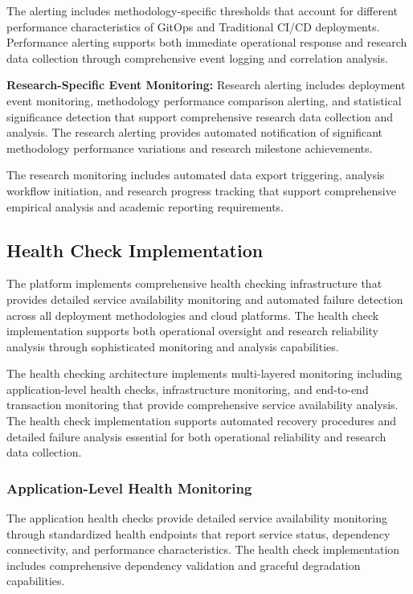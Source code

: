 The alerting includes methodology-specific thresholds that account for different performance characteristics of GitOps and Traditional CI/CD deployments. Performance alerting supports both immediate operational response and research data collection through comprehensive event logging and correlation analysis.

\textbf{Research-Specific Event Monitoring:}
Research alerting includes deployment event monitoring, methodology performance comparison alerting, and statistical significance detection that support comprehensive research data collection and analysis. The research alerting provides automated notification of significant methodology performance variations and research milestone achievements.

The research monitoring includes automated data export triggering, analysis workflow initiation, and research progress tracking that support comprehensive empirical analysis and academic reporting requirements.

\subsection{Health Check Implementation}

The platform implements comprehensive health checking infrastructure that provides detailed service availability monitoring and automated failure detection across all deployment methodologies and cloud platforms. The health check implementation supports both operational oversight and research reliability analysis through sophisticated monitoring and analysis capabilities.

The health checking architecture implements multi-layered monitoring including application-level health checks, infrastructure monitoring, and end-to-end transaction monitoring that provide comprehensive service availability analysis. The health check implementation supports automated recovery procedures and detailed failure analysis essential for both operational reliability and research data collection.

\subsubsection{Application-Level Health Monitoring}

The application health checks provide detailed service availability monitoring through standardized health endpoints that report service status, dependency connectivity, and performance characteristics. The health check implementation includes comprehensive dependency validation and graceful degradation capabilities.

